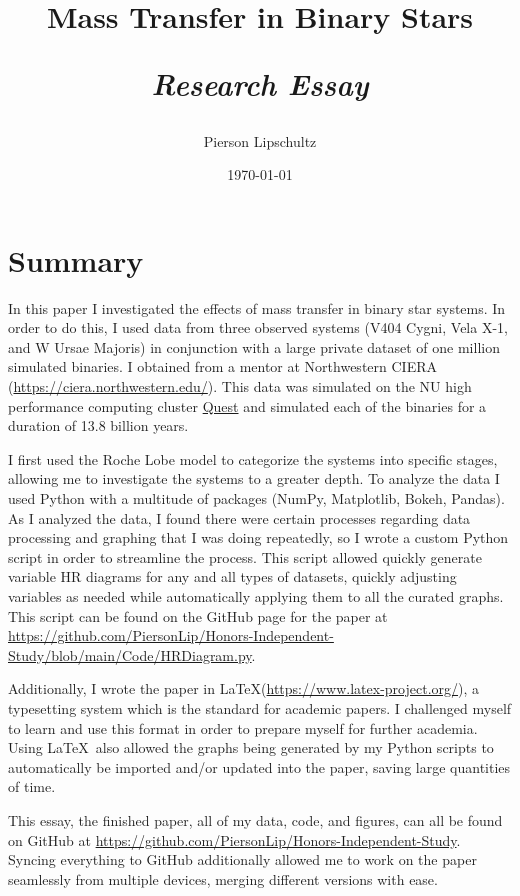 \documentclass[12pt, a4paper]{article}
\title{Mass Transfer in Binary Stars 

\textit{Research Essay}}
\author{Pierson Lipschultz}
\begin{document}
\date{\today}
\maketitle
\section{Summary}
    In this paper I investigated the effects of mass transfer in binary star systems. In order to do this,  I used data from three observed systems (V404 Cygni, Vela X-1, and W Ursae Majoris) in conjunction with a large private dataset of one million simulated binaries. I obtained from a mentor at Northwestern CIERA (\url{https://ciera.northwestern.edu/}). This data was simulated on the NU high performance computing cluster \href{https://www.it.northwestern.edu/departments/it-services-support/research/computing/quest/}{Quest} and simulated each of the binaries for a duration of 13.8 billion years.

    I first used the Roche Lobe model to categorize the systems into specific stages, allowing me to investigate the systems to a greater depth. To analyze the data I used Python with a multitude of packages (NumPy, Matplotlib, Bokeh, Pandas). As I analyzed the data, I found there were certain processes regarding data processing and graphing that I was doing repeatedly, so I wrote a custom Python script in order to streamline the process. This script allowed quickly generate variable HR diagrams for any and all types of datasets, quickly adjusting variables as needed while automatically applying them to all the curated graphs. This script can be found on the GitHub page for the paper at \url{https://github.com/PiersonLip/Honors-Independent-Study/blob/main/Code/HRDiagram.py}.

	Additionally, I wrote the paper in \LaTeX (\url{https://www.latex-project.org/}), a typesetting system which is the standard for academic papers. I challenged myself to learn and use this format in order to prepare myself for further academia. Using \LaTeX ~also allowed the graphs being generated by my Python scripts to automatically be imported and/or updated into the paper, saving large quantities of time.

	This essay, the finished paper, all of my data, code, and figures, can all be found on GitHub at \url{https://github.com/PiersonLip/Honors-Independent-Study}. Syncing everything to GitHub additionally allowed me to work on the paper seamlessly from multiple devices, merging different versions with ease. 
\end{document}
